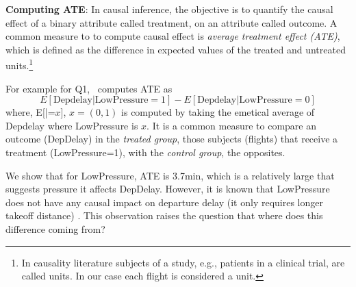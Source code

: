  { \bf Computing ATE}: In causal inference, the objective is to quantify
 the causal effect of a binary attribute called treatment, on an attribute called outcome.
 A common measure to to compute causal effect is {\em average treatment effect (ATE)}, which is defined as the difference in expected values of the treated and untreated units.\footnote{In causality literature subjects of a study,
  e.g., patients in a clinical trial, are called units. In our case each flight
   is considered a unit.} For example for Q1, \GSQL\ computes ATE as $$E[\text{Depdelay}|\text{LowPressure}=1] - E[\text{Depdelay}|\text{LowPressure}=0]$$
  where, E[|=$x$], $x=(0,1)$ is
  computed by taking the emetical average of  Depdelay where LowPressure is  $x$.
  It is a  common measure to compare an
  outcome (DepDelay) in the {\em treated group},  those subjects
  (flights) that receive a treatment (LowPressure=1), with the {\em control group}, the opposites.
  We show that for LowPressure, ATE is 3.7min, which is a relatively large that suggests pressure it affects DepDelay. However, it is known that
  LowPressure does not have any causal impact on departure delay (it only requires longer takeoff distance) \cite{FAA08}. This observation raises the question that  where does this difference coming from?




